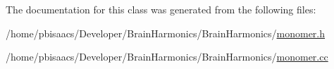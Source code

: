 The documentation for this class was generated from the following files\+:\begin{DoxyCompactItemize}
\item 
/home/pbisaacs/\+Developer/\+Brain\+Harmonics/\+Brain\+Harmonics/\mbox{\hyperlink{monomer_8h}{monomer.\+h}}\item 
/home/pbisaacs/\+Developer/\+Brain\+Harmonics/\+Brain\+Harmonics/\mbox{\hyperlink{monomer_8cc}{monomer.\+cc}}\end{DoxyCompactItemize}
